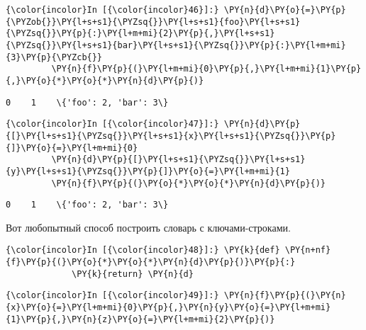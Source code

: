     \begin{Verbatim}[commandchars=\\\{\}]
{\color{incolor}In [{\color{incolor}46}]:} \PY{n}{d}\PY{o}{=}\PY{p}{\PYZob{}}\PY{l+s+s1}{\PYZsq{}}\PY{l+s+s1}{foo}\PY{l+s+s1}{\PYZsq{}}\PY{p}{:}\PY{l+m+mi}{2}\PY{p}{,}\PY{l+s+s1}{\PYZsq{}}\PY{l+s+s1}{bar}\PY{l+s+s1}{\PYZsq{}}\PY{p}{:}\PY{l+m+mi}{3}\PY{p}{\PYZcb{}}
         \PY{n}{f}\PY{p}{(}\PY{l+m+mi}{0}\PY{p}{,}\PY{l+m+mi}{1}\PY{p}{,}\PY{o}{*}\PY{o}{*}\PY{n}{d}\PY{p}{)}
\end{Verbatim}

    \begin{Verbatim}[commandchars=\\\{\}]
0    1    \{'foo': 2, 'bar': 3\}

    \end{Verbatim}

    \begin{Verbatim}[commandchars=\\\{\}]
{\color{incolor}In [{\color{incolor}47}]:} \PY{n}{d}\PY{p}{[}\PY{l+s+s1}{\PYZsq{}}\PY{l+s+s1}{x}\PY{l+s+s1}{\PYZsq{}}\PY{p}{]}\PY{o}{=}\PY{l+m+mi}{0}
         \PY{n}{d}\PY{p}{[}\PY{l+s+s1}{\PYZsq{}}\PY{l+s+s1}{y}\PY{l+s+s1}{\PYZsq{}}\PY{p}{]}\PY{o}{=}\PY{l+m+mi}{1}
         \PY{n}{f}\PY{p}{(}\PY{o}{*}\PY{o}{*}\PY{n}{d}\PY{p}{)}
\end{Verbatim}

    \begin{Verbatim}[commandchars=\\\{\}]
0    1    \{'foo': 2, 'bar': 3\}

    \end{Verbatim}

    Вот любопытный способ построить словарь с ключами-строками.

    \begin{Verbatim}[commandchars=\\\{\}]
{\color{incolor}In [{\color{incolor}48}]:} \PY{k}{def} \PY{n+nf}{f}\PY{p}{(}\PY{o}{*}\PY{o}{*}\PY{n}{d}\PY{p}{)}\PY{p}{:}
             \PY{k}{return} \PY{n}{d}
\end{Verbatim}

    \begin{Verbatim}[commandchars=\\\{\}]
{\color{incolor}In [{\color{incolor}49}]:} \PY{n}{f}\PY{p}{(}\PY{n}{x}\PY{o}{=}\PY{l+m+mi}{0}\PY{p}{,}\PY{n}{y}\PY{o}{=}\PY{l+m+mi}{1}\PY{p}{,}\PY{n}{z}\PY{o}{=}\PY{l+m+mi}{2}\PY{p}{)}
\end{Verbatim}

